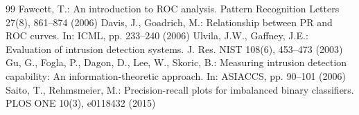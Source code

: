 \documentclass[runningheads]{llncs}
\begin{document}
\begin{thebibliography}{99}
 Fawcett, T.: An introduction to ROC analysis. Pattern Recognition Letters 27(8), 861--874 (2006)
 Davis, J., Goadrich, M.: Relationship between PR and ROC curves. In: ICML, pp. 233--240 (2006)
 Ulvila, J.W., Gaffney, J.E.: Evaluation of intrusion detection systems. J. Res. NIST 108(6), 453--473 (2003)
 Gu, G., Fogla, P., Dagon, D., Lee, W., Skoric, B.: Measuring intrusion detection capability: An information-theoretic approach. In: ASIACCS, pp. 90--101 (2006)
 Saito, T., Rehmsmeier, M.: Precision-recall plots for imbalanced binary classifiers. PLOS ONE 10(3), e0118432 (2015)
\end{thebibliography}
\end{document}
